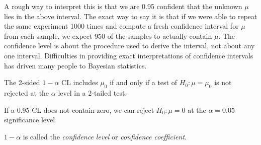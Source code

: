 A rough way to interpret this is that we are 0.95 confident that the
unknown $\mu$ lies in the above interval.  The exact way to say it is
that if we were able to repeat the same experiment 1000 times and
compute a fresh confidence interval for $\mu$ from each sample, we
expect 950 of the samples to actually contain $\mu$.  The confidence
level is about the procedure used to derive the interval, not about
any one interval.  Difficulties in
providing exact interpretations of confidence intervals has driven
many people to Bayesian statistics.

The 2-sided $1-\alpha$ CL includes $\mu_{0}$ if and only if a test of $H_{0}:
\mu=\mu_{0}$ is not rejected at the $\alpha$ level in a 2-tailed test.
\bi
\item If a 0.95 CL does not contain zero, we can reject $H_0: \mu = 0$ at the $\alpha = 0.05$ significance level
\ei

$1 - \alpha$ is called the \emph{confidence level} or \emph{confidence
  coefficient}.

